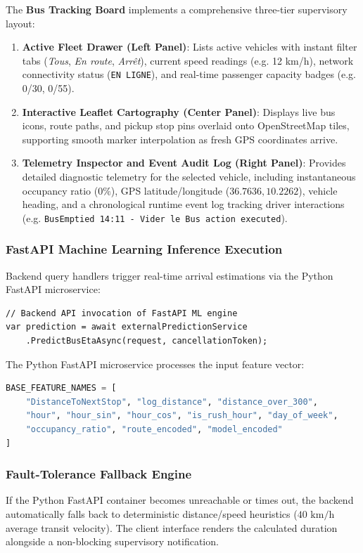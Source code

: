 The \textbf{Bus Tracking Board} implements a comprehensive three-tier supervisory layout:
\begin{enumerate}
  \item \textbf{Active Fleet Drawer (Left Panel)}: Lists active vehicles with instant filter tabs (\emph{Tous}, \emph{En route}, \emph{Arrêt}), current speed readings (e.g. 12 km/h), network connectivity status (\texttt{EN LIGNE}), and real-time passenger capacity badges (e.g. 0/30, 0/55).
  \item \textbf{Interactive Leaflet Cartography (Center Panel)}: Displays live bus icons, route paths, and pickup stop pins overlaid onto OpenStreetMap tiles, supporting smooth marker interpolation as fresh GPS coordinates arrive.
  \item \textbf{Telemetry Inspector and Event Audit Log (Right Panel)}: Provides detailed diagnostic telemetry for the selected vehicle, including instantaneous occupancy ratio ($0\%$), GPS latitude/longitude ($36.7636, 10.2262$), vehicle heading, and a chronological runtime event log tracking driver interactions (e.g. \texttt{BusEmptied 14:11 - Vider le Bus action executed}).
\end{enumerate}

\subsubsection{FastAPI Machine Learning Inference Execution}
Backend query handlers trigger real-time arrival estimations via the Python FastAPI microservice:
\begin{lstlisting}[language=CSharp,caption={Backend Invocation of FastAPI ML Engine}]
// Backend API invocation of FastAPI ML engine
var prediction = await externalPredictionService
    .PredictBusEtaAsync(request, cancellationToken);
\end{lstlisting}

The Python FastAPI microservice processes the input feature vector:
\begin{lstlisting}[language=Python,caption={Machine Learning Regression Feature Definition}]
BASE_FEATURE_NAMES = [
    "DistanceToNextStop", "log_distance", "distance_over_300",
    "hour", "hour_sin", "hour_cos", "is_rush_hour", "day_of_week",
    "occupancy_ratio", "route_encoded", "model_encoded"
]
\end{lstlisting}

\subsubsection{Fault-Tolerance Fallback Engine}
If the Python FastAPI container becomes unreachable or times out, the backend automatically falls back to deterministic distance/speed heuristics ($40\text{ km/h}$ average transit velocity). The client interface renders the calculated duration alongside a non-blocking supervisory notification.


